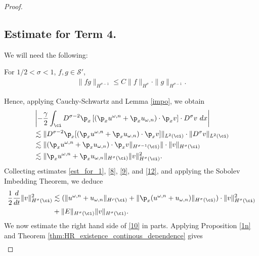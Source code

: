 \begin{proof}
\subsection{Estimate for Term 4.}
We will need the following:
\begin{lemma}
	\label{impo}
	For $1/2 < \sigma < 1 $, $f,g \in \mathcal{S'}$,
	\begin{equation}
		\begin{split}
			\|fg\|_{H^{\sigma - 1}} \le C \|f\|_{H^{\sigma}}
			\cdot \|g\|_{H^{\sigma -1}}.
			\label{11}
		\end{split}
	\end{equation}
\end{lemma}
%
	Hence, applying Cauchy-Schwartz and Lemma \ref{impo}, we obtain
	\begin{equation}
		\begin{split}
			& \left | -\frac{\gamma}{2} \int_{\ci} D^{\sigma -2 } \p_x \left[
			\left( \p_x u^{\omega,n} + \p_x u_{\omega,n} \right) \cdot \p_x v
			\right] \cdot D^\sigma v \ dx \right |
			\\
			& \lesssim \|D^{\sigma -2} \p_x [(\p_x u^{\omega,n} + \p_x
			u_{\omega,n}) \cdot \p_x v]\|_{L^2(\ci)} \cdot \|D^\sigma v
			\|_{L^2(\ci)}
			\\
			& \lesssim \|(\p_x u^{\omega,n} + \p_x u_{\omega,n}) \cdot \p_x v
			\|_{H^{\sigma -1}(\ci)} \| \cdot \|v\|_{H^\sigma (\ci)} 
			\\
			& \lesssim \|\p_x u^{\omega,n} + 
			\p_x u_{\omega,n}
			\|_{H^\sigma(\ci)} \|v\|_{H^\sigma(\ci)}^2.
			\label{12}
		\end{split}
	\end{equation}
Collecting estimates \eqref{est_for_1}, \eqref{8}, \eqref{9}, and
\eqref{12}, and applying the Sobolev Imbedding Theorem, we deduce
\begin{equation}
	\begin{split}
		\frac{1}{2}\frac{d}{dt} \|v\|_{H^\sigma(\ci)}^2
		& \lesssim
		(\|u^{\omega,n} + u_{\omega,n}\|_{H^{\rho}(\ci)} +
		\|\p_x(u^{\omega,n} + u_{\omega,n}) \|_{H^\sigma(\ci)})
		\cdot \|v\|_{H^\sigma(\ci)}^2
		\\
		& + \|E\|_{H^\sigma(\ci)}
		\|v\|_{H^\sigma(\ci)}.
		\label{10}
	\end{split}
\end{equation}
We now estimate the right hand side of \eqref{10} in parts. Applying
Proposition \ref{1n} and Theorem \ref{thm:HR_existence_continous_dependence} 
gives
\begin{equation}
	\begin{split}

\end{split}
\end{equation}
\end{proof}
